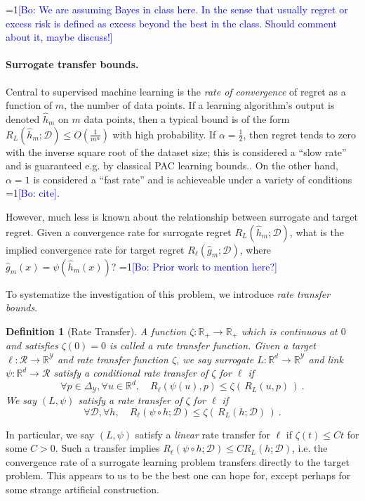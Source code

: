 \documentclass{article}
\newtheorem{definition}{Definition}
\newcommand{\Comments}{1}
\newcommand{\mynote}[2]{\ifnum\Comments=1\textcolor{#1}{#2}\fi}
\newcommand{\bo}[1]{\mynote{blue}{[Bo: #1]}}
\newcommand{\reals}{\mathbb{R}}
\newcommand{\simplex}{\Delta_\Y}
\newcommand{\D}{\mathcal{D}}
\newcommand{\R}{\mathcal{R}}
\newcommand{\Y}{\mathcal{Y}}
\begin{document}
\bo{We are assuming Bayes in class here. In the sense that usually regret or excess risk is defined as excess beyond the best in the class. Should comment about it, maybe discuss!}

\paragraph{Surrogate transfer bounds.}
Central to supervised machine learning is the \emph{rate of convergence} of regret as a function of $m$, the number of data points.
If a learning algorithm's output is denoted $\hat{h}_m$ on $m$ data points, then a typical bound is of the form $R_L(\hat{h}_m;\D) \leq O\left(\frac{1}{m^{\alpha}}\right)$ with high probability.
If $\alpha = \frac{1}{2}$, then regret tends to zero with the inverse square root of the dataset size; this is considered a ``slow rate'' and is guaranteed e.g. by classical PAC learning bounds..
On the other hand, $\alpha = 1$ is considered a ``fast rate'' and is achieveable under a variety of conditions \bo{cite}.

However, much less is known about the relationship between surrogate and target regret.
Given a convergence rate for surrogate regret $R_L(\hat{h}_m;\D)$, what is the implied convergence rate for target regret $R_{\ell}(\hat{g}_m;\D)$, where $\hat{g}_m(x) = \psi(\hat{h}_m(x))$?
\bo{Prior work to mention here?}

To systematize the investigation of this problem, we introduce \emph{rate transfer bounds}.

\begin{definition}[Rate Transfer]\label{def:transfer}
  A function $\zeta : \reals_+ \to \reals_+$ which is continuous at $0$ and satisfies $\zeta(0) = 0$ is called a \emph{rate transfer function.}
	Given a target $\ell:\R\to\reals^\Y$ and rate transfer function $\zeta$, we say surrogate $L:\reals^d\to\reals^\Y$ and link $\psi : \reals^d \to \R$ satisfy a \emph{conditional rate transfer} of $\zeta$ for $\ell$ if
  \begin{equation}
    \label{eq:conditional-transfer}
    \forall p\in\simplex, \forall u\in\reals^d, \quad R_\ell(\psi(u),p) \leq \zeta(\, R_L(u,p) \,)~.
  \end{equation}
  We say $(L,\psi)$ satisfy a \emph{rate transfer} of $\zeta$ for $\ell$ if
  \begin{equation}
    \label{eq:transfer}
    \forall \D, \forall h, \quad R_\ell(\psi \circ h;\D) \leq \zeta(\, R_L(h;\D) \,)~.
  \end{equation}
\end{definition}
In particular, we say $(L,\psi)$ satisfy a \emph{linear} rate transfer for $\ell$ if $\zeta(t) \leq Ct$ for some $C > 0$.
Such a transfer implies $R_{\ell}(\psi \circ h;\D) \leq C R_L(h;\D)$, i.e. the convergence rate of a surrogate learning problem transfers directly to the target problem.
This appears to us to be the best one can hope for, except perhaps for some strange artificial construction.
\end{document}
